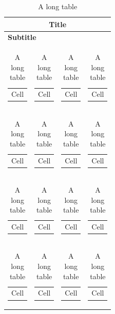 \begin{longtable}{|l|l|l|l|}

\caption{A long table}\label{table:long_table}\\

\hline

\multicolumn{4}{|c|}{{\textbf{Title}}} \\ \hline
\multicolumn{4}{|l|}{\textbf{Subtitle}} \\ \hline

\begin{tabular}[c]{@{}l@{}} Cell \end{tabular} &
\begin{tabular}[c]{@{}l@{}} Cell \end{tabular} &
\begin{tabular}[c]{@{}l@{}} Cell \end{tabular} & 
\begin{tabular}[c]{@{}l@{}} Cell \end{tabular} \\ \hline

\begin{tabular}[c]{@{}l@{}} Cell \end{tabular} &
\begin{tabular}[c]{@{}l@{}} Cell \end{tabular} &
\begin{tabular}[c]{@{}l@{}} Cell \end{tabular} & 
\begin{tabular}[c]{@{}l@{}} Cell \end{tabular} \\ \hline

\begin{tabular}[c]{@{}l@{}} Cell \end{tabular} &
\begin{tabular}[c]{@{}l@{}} Cell \end{tabular} &
\begin{tabular}[c]{@{}l@{}} Cell \end{tabular} & 
\begin{tabular}[c]{@{}l@{}} Cell \end{tabular} \\ \hline

\begin{tabular}[c]{@{}l@{}} Cell \end{tabular} &
\begin{tabular}[c]{@{}l@{}} Cell \end{tabular} &
\begin{tabular}[c]{@{}l@{}} Cell \end{tabular} & 
\begin{tabular}[c]{@{}l@{}} Cell \end{tabular} \\ \hline


\end{longtable}
